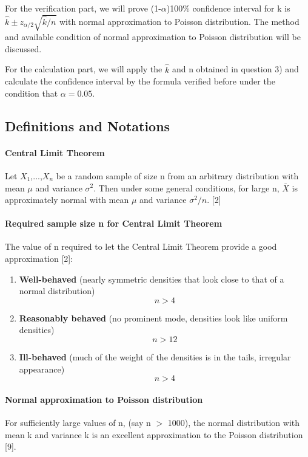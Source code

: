 \documentclass[a4paper]{article}
\begin{document}
For the verification part, we will prove (1-$\alpha$)100\% confidence interval for k is $\hat{k}\pm z_{\alpha/2}\sqrt{\hat{k}/n}$ with normal approximation to Poisson distribution. The method and available condition of normal approximation to Poisson distribution will be discussed.

For the calculation part, we will apply the $\hat{k}$ and n obtained in question 3) and calculate the confidence interval by the formula verified before under the condition that $\alpha = 0.05$.

\subsection{Definitions and Notations}
\paragraph{Central Limit Theorem} Let $X_1$,...,$X_n$ be a random sample of size n from an arbitrary distribution with mean $\mu$ and variance $\sigma^2$. Then under some general conditions, for large n, $\bar{X}$ is approximately normal with mean $\mu$ and variance $\sigma^2/n$. [2]

\paragraph{Required sample size n for Central Limit Theorem}

The value of n required to let the Central Limit Theorem provide a good approximation [2]:

\begin{enumerate}
    \item \textbf{Well-behaved} (nearly symmetric densities that look close to that of a normal distribution)
    $$n > 4$$
    \item \textbf{Reasonably behaved} (no prominent mode, densities look like uniform densities) 
    $$n > 12$$
    \item \textbf{Ill-behaved} (much of the weight of the densities is in the tails, irregular appearance) 
    $$n > 4$$
\end{enumerate}

\paragraph{Normal approximation to Poisson distribution} For sufficiently large values of n, (say n $>$ 1000), the normal distribution with mean k and variance k is an excellent approximation to the Poisson distribution [9]. 
\end{document}
